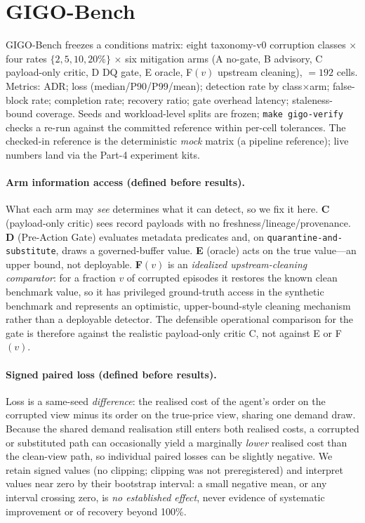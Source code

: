 \documentclass[11pt]{article}
\theoremstyle{plain}
\theoremstyle{definition}
\begin{document}
\section{GIGO-Bench}\label{sec:gigo}
GIGO-Bench freezes a conditions matrix: eight taxonomy-v0 corruption classes
$\times$ four rates $\{2,5,10,20\%\}$ $\times$ six mitigation arms (A no-gate, B
advisory, C payload-only critic, D DQ gate, E oracle, F$(v)$ upstream cleaning),
$=192$ cells. Metrics: ADR; loss (median/P90/P99/mean); detection rate by
class$\times$arm; false-block rate; completion rate; recovery ratio; gate overhead
latency; staleness-bound coverage. Seeds and workload-level splits are frozen;
\texttt{make gigo-verify} checks a re-run against the committed reference within
per-cell tolerances. The checked-in reference is the deterministic \emph{mock}
matrix (a pipeline reference); live numbers land via the Part-4 experiment kits.

\paragraph{Arm information access (defined before results).} What each arm may \emph{see}
determines what it can detect, so we fix it here. \textbf{C} (payload-only critic) sees
record payloads with no freshness/lineage/provenance. \textbf{D} (Pre-Action Gate) evaluates
metadata predicates and, on \texttt{quarantine-and-substitute}, draws a governed-buffer
value. \textbf{E} (oracle) acts on the true value---an upper bound, not deployable.
\textbf{F$(v)$} is an \emph{idealized upstream-cleaning comparator}: for a fraction $v$ of
corrupted episodes it restores the known clean benchmark value, so it has privileged
ground-truth access in the synthetic benchmark and represents an optimistic,
upper-bound-style cleaning mechanism rather than a deployable detector. The defensible
operational comparison for the gate is therefore against the realistic payload-only critic
C, not against E or F$(v)$.

\paragraph{Signed paired loss (defined before results).} Loss is a same-seed
\emph{difference}: the realised cost of the agent's order on the corrupted view minus its
order on the true-price view, sharing one demand draw. Because the shared demand realisation
still enters both realised costs, a corrupted or substituted path can occasionally yield a
marginally \emph{lower} realised cost than the clean-view path, so individual paired losses
can be slightly negative. We retain signed values (no clipping; clipping was not
preregistered) and interpret values near zero by their bootstrap interval: a small negative
mean, or any interval crossing zero, is \emph{no established effect}, never evidence of
systematic improvement or of recovery beyond 100\%.
\end{document}
